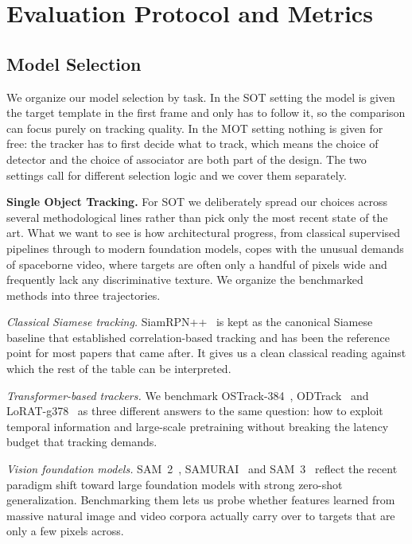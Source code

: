 \documentclass{article}
\begin{document}
\section{Evaluation Protocol and Metrics}
\subsection{Model Selection}
\label{sec:model_selection}
We organize our model selection by task. In the SOT setting the model is
given the target template in the first frame and only has to follow it, so
the comparison can focus purely on tracking quality. In the MOT setting
nothing is given for free: the tracker has to first decide what to track,
which means the choice of detector and the choice of associator are both
part of the design. The two settings call for different selection logic
and we cover them separately.

\noindent\textbf{Single Object Tracking.}
For SOT we deliberately spread our choices across several methodological
lines rather than pick only the most recent state of the art. What we want
to see is how architectural progress, from classical supervised pipelines
through to modern foundation models, copes with the unusual demands of
spaceborne video, where targets are often only a handful of pixels wide
and frequently lack any discriminative texture. We organize the
benchmarked methods into three trajectories.

\textit{Classical Siamese tracking.} SiamRPN++~\citep{li2019siamrpn++} is
kept as the canonical Siamese baseline that established correlation-based
tracking and has been the reference point for most papers that came
after. It gives us a clean classical reading against which the rest of
the table can be interpreted.

\textit{Transformer-based trackers.} We benchmark
OSTrack-384~\citep{ye2022joint}, ODTrack~\citep{zheng2024odtrack} and
LoRAT-g378~\citep{lin2024tracking} as three different answers to the same
question: how to exploit temporal information and large-scale pretraining
without breaking the latency budget that tracking demands.

\textit{Vision foundation models.} SAM~2~\citep{ravi2024sam},
SAMURAI~\citep{yang2026samurai} and SAM~3~\citep{carion2026sam3} reflect
the recent paradigm shift toward large foundation models with strong
zero-shot generalization. Benchmarking them lets us probe whether
features learned from massive natural image and video corpora actually
carry over to targets that are only a few pixels across.
\end{document}

